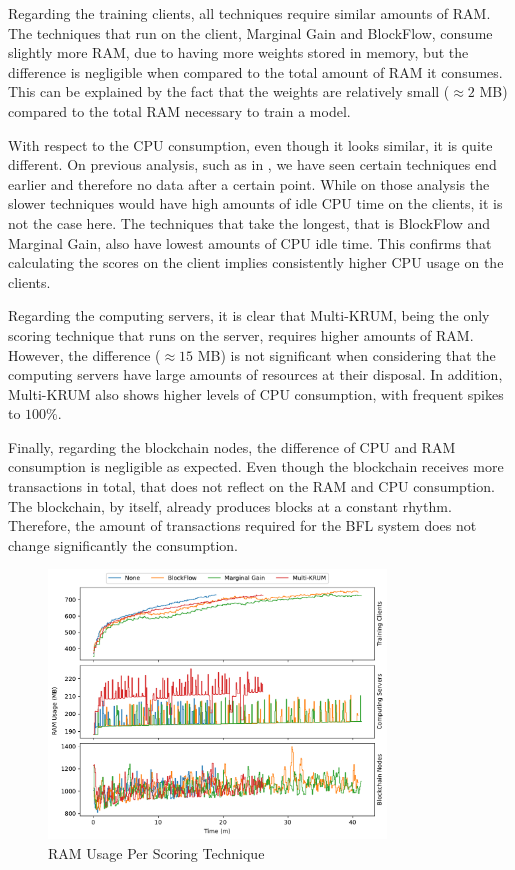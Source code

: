 Regarding the training clients, all techniques require similar amounts of RAM. The techniques that run on the client, Marginal Gain and BlockFlow, consume slightly more RAM, due to having more weights stored in memory, but the difference is negligible when compared to the total amount of RAM it consumes. This can be explained by the fact that the weights are relatively small ($\approx 2$ MB) compared to the total RAM necessary to train a model.

With respect to the CPU consumption, even though it looks similar, it is quite different. On previous analysis, such as in , we have seen certain techniques end earlier and therefore no data after a certain point. While on those analysis the slower techniques would have high amounts of idle CPU time on the clients, it is not the case here. The techniques that take the longest, that is BlockFlow and Marginal Gain, also have lowest amounts of CPU idle time. This confirms that calculating the scores on the client implies consistently higher CPU usage on the clients.

Regarding the computing servers, it is clear that Multi-KRUM, being the only scoring technique that runs on the server, requires higher amounts of RAM. However, the difference ($\approx 15$ MB) is not significant when considering that the computing servers have large amounts of resources at their disposal. In addition, Multi-KRUM also shows higher levels of CPU consumption, with frequent spikes to $100\%$.

Finally, regarding the blockchain nodes, the difference of CPU and RAM consumption is negligible as expected. Even though the blockchain receives more transactions in total, that does not reflect on the RAM and CPU consumption. The blockchain, by itself, already produces blocks at a constant rhythm. Therefore, the amount of transactions required for the BFL system does not change significantly the consumption.

\begin{figure}[!hpt]
    \centering
    \centering
    \includegraphics[width=0.8\textwidth]{graphics/scoring/ram.pdf}
    \caption{RAM Usage Per Scoring Technique}
    \label{fig:ram_scoring}
\end{figure}


